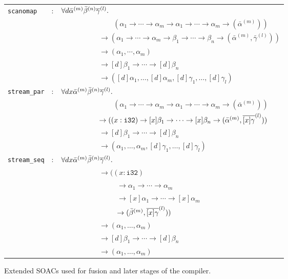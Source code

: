 \begin{figure}[hbt]
\begin{tabular}{lcl}
  {\lstinline!scanomap!} & : & $\forall d \bar{\alpha}^{(m)}\bar{\beta}^{(n)}\overline{\gamma}^{(l)}.$\\
          & & ~~~~~~~~~~~~~~ $(\alpha_1 \rightarrow \cdots \rightarrow \alpha_m \rightarrow \alpha_1 \rightarrow \cdots \rightarrow \alpha_m \rightarrow (\bar{\alpha}^{(m)}))$\\
          & & ~~~~~~~~~~ $\rightarrow (\alpha_1 \rightarrow \cdots \rightarrow \alpha_m \rightarrow \beta_1 \rightarrow \cdots \rightarrow \beta_n \rightarrow (\bar{\alpha}^{(m)}, \bar{\gamma}^{(l)}))$ \\
          & & ~~~~~~~~~~ $\rightarrow (\alpha_1, \cdots, \alpha_m)$\\
          & & ~~~~~~~~~~ $\rightarrow [d]\beta_1 \rightarrow \cdots \rightarrow [d]\beta_n$\\
          & & ~~~~~~~~~~ $\rightarrow ([d]\alpha_1,\ldots,[d]\alpha_m,[d]\gamma_{1},\ldots,[d]\gamma_{l})$ \\
  {\lstinline!stream_par!} & : & $\forall d x \bar{\alpha}^{(m)}\bar{\beta}^{(n)}\overline{\gamma}^{(l)}.$\\
          & & ~~~~~~~~~~~~~~ $(\alpha_1 \rightarrow \cdots \rightarrow \alpha_m \rightarrow \alpha_1 \rightarrow \cdots \rightarrow \alpha_m \rightarrow (\bar{\alpha}^{(m)}))$\\
          & & ~~~~~~~~~~ $\rightarrow ((x: \texttt{i32}) \rightarrow [x]\beta_1 \rightarrow \cdots \rightarrow [x]\beta_n \rightarrow (\bar{\alpha}^{(m)}, \overline{[x]\gamma}^{(l)}))$ \\
          & & ~~~~~~~~~~ $\rightarrow [d]\beta_1 \rightarrow \cdots \rightarrow [d]\beta_n$\\
          & & ~~~~~~~~~~ $\rightarrow (\alpha_1,\ldots,\alpha_m,[d]\gamma_{1},\ldots,[d]\gamma_{l})$ \\
  {\lstinline!stream_seq!} & : & $\forall d x \bar{\alpha}^{(m)}\bar{\beta}^{(n)}\overline{\gamma}^{(l)}.$\\
          & & ~~~~~~~~~~ $\rightarrow ((x: \texttt{i32})$ \\
          & & ~~~~~~~~~~~~~~~ $\rightarrow \alpha_1 \rightarrow \cdots \rightarrow \alpha_m$ \\
          & & ~~~~~~~~~~~~~~~ $\rightarrow [x]\alpha_1 \rightarrow \cdots \rightarrow [x]\alpha_m$ \\
          & & ~~~~~~~~~~~~~~~ $\rightarrow (\bar{\beta}^{(m)}, \overline{[x]\gamma}^{(l)}))$ \\
          & & ~~~~~~~~~~ $\rightarrow (\alpha_1, \ldots, \alpha_m)$\\
          & & ~~~~~~~~~~ $\rightarrow [d]\beta_1 \rightarrow \cdots \rightarrow [d]\beta_n$\\
          & & ~~~~~~~~~~ $\rightarrow (\alpha_1,\ldots,\alpha_m)$ \\

\end{tabular}
\caption{Extended SOACs used for fusion and later stages of the compiler.}
\label{fig:newSoacType}
\end{figure}


